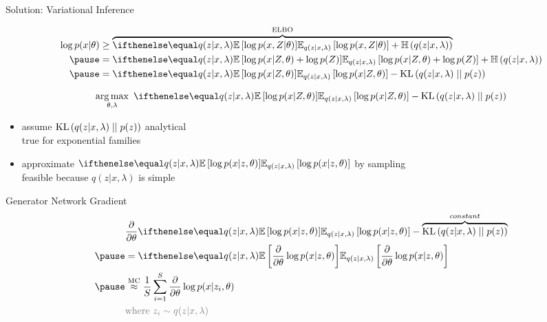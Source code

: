 \documentclass[14pt]{beamer}
\begin{document}
\begin{frame}{Solution: Variational Inference}

\vspace{-10pt}
\begin{small}
\begin{equation*}
\begin{aligned}
\log p(x|\theta) &\geq \overbrace{\E[q(z|x, \lambda)]{\log p(x,Z|\theta)} + \Ent{q(z|x, \lambda)}}^{\ELBO} \\ 
\pause
&= \E[q(z|x, \lambda)]{\log p(x|Z, \theta) + \log p(Z)} + \Ent{q(z|x, \lambda)} \\ \pause
&= \E[q(z|x, \lambda)]{\log p(x|Z, \theta)} - \KL{q(z|x, \lambda)}{p(z)}
\end{aligned}
\end{equation*}
\end{small}

\pause

\vspace{-20pt}
\begin{equation*}
\argmax_{\theta,\lambda} ~ \E[q(z|x, \lambda)]{\log p(x|Z, \theta)} - \KL{q(z|x, \lambda)}{p(z)}
\end{equation*}


\pause

\begin{itemize}
	\item assume $\operatorname{KL}\left(q(z|x, \lambda)\mid\mid p(z)\right)$  analytical\\
	true for exponential families \pause
	\item approximate $\E[q(z|x, \lambda)]{\log p(x|z, \theta)}$ by sampling\\
	feasible because  $q(z|x, \lambda)$ is simple
\end{itemize}


\end{frame}

\begin{frame}{Generator Network Gradient}
\vspace{-10pt}
\begin{equation*}
\begin{aligned}
&\pdv{\theta}\E[q(z|x,\lambda)]{\log p(x|z,\theta)} - \overbrace{\KL{q(z|x,\lambda)}{p(z)}}^{constant} \\ \pause 
&=\E[q(z|x,\lambda)]{\pdv{\theta}\log p(x|z,\theta)} \\ \pause
&\overset{\text{MC}}{\approx} \frac{1}{S}\sum_{i=1}^{S}
\pdv{\theta} \log p(x|z_{i},\theta) \\
&\textcolor{gray}{\text{where }z_i \sim q(z|x, \lambda)}
\end{aligned}
\end{equation*}
\pause
{}
\end{frame}
\end{document}
